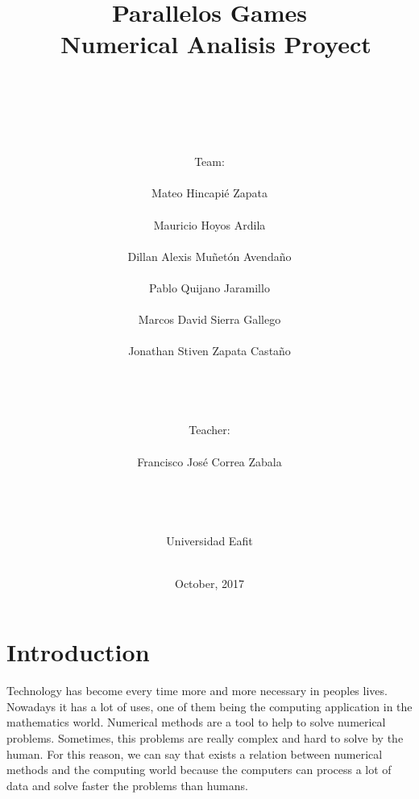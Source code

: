 \documentclass{article}
\begin{document}
\title{Parallelos Games\\\
Numerical Analisis Proyect}
\author{
\\\\\\\\\\
 Team:\\\\
  Mateo Hincapi\'e Zapata\\\\
  Mauricio Hoyos Ardila\\\\
  Dillan Alexis Muñet\'on Avendaño\\\\
  Pablo Quijano Jaramillo\\\\
  Marcos David Sierra Gallego\\\\
  Jonathan Stiven Zapata Castaño\\\\\\\\\\
  Teacher:\\\\
  Francisco Jos\'e Correa Zabala\\\\\\\\\\
  Universidad Eafit\\\\
  }
\date{October, 2017}

\maketitle

\newpage

\tableofcontents

\newpage

\section{Introduction}

Technology has become every time more and more necessary in peoples lives. Nowadays it has a lot of uses, one of them being the computing application in the mathematics world. Numerical methods  are a tool to help to solve numerical
problems. Sometimes, this problems are really complex and hard to solve by
the human. For this reason, we can say that exists a relation between numerical
methods  and the computing world because the computers can process a lot of data
and solve faster the problems than humans.\\
\end{document}
